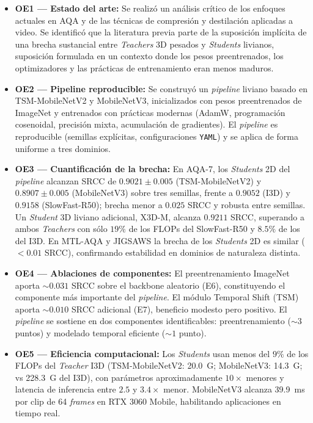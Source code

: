 \begin{itemize}
    \item \textbf{OE1 — Estado del arte:} Se realizó un análisis crítico de los enfoques actuales en \ac{AQA} y de las técnicas de compresión y destilación aplicadas a video. Se identificó que la literatura previa parte de la suposición implícita de una brecha sustancial entre \textit{Teachers} 3D pesados y \textit{Students} livianos, suposición formulada en un contexto donde los pesos preentrenados, los optimizadores y las prácticas de entrenamiento eran menos maduros.

    \item \textbf{OE2 — Pipeline reproducible:} Se construyó un \textit{pipeline} liviano basado en TSM-MobileNetV2 y MobileNetV3, inicializados con pesos preentrenados de ImageNet y entrenados con prácticas modernas (AdamW, programación cosenoidal, precisión mixta, acumulación de gradientes). El \textit{pipeline} es reproducible (semillas explícitas, configuraciones \texttt{YAML}) y se aplica de forma uniforme a tres dominios.

    \item \textbf{OE3 — Cuantificación de la brecha:} En AQA-7, los \textit{Students} 2D del \textit{pipeline} alcanzan \ac{SRCC} de $0.9021 \pm 0.005$ (TSM-MobileNetV2) y $0.8907 \pm 0.005$ (MobileNetV3) sobre tres semillas, frente a $0.9052$ (\ac{I3D}) y $0.9158$ (SlowFast-R50); brecha menor a $0.025$ \ac{SRCC} y robusta entre semillas. Un \textit{Student} 3D liviano adicional, X3D-M, alcanza $0.9211$ \ac{SRCC}, superando a ambos \textit{Teachers} con sólo $19\%$ de los \ac{FLOPs} del SlowFast-R50 y $8.5\%$ de los del \ac{I3D}. En MTL-AQA y JIGSAWS la brecha de los \textit{Students} 2D es similar ($<0.01$ \ac{SRCC}), confirmando estabilidad en dominios de naturaleza distinta.

    \item \textbf{OE4 — Ablaciones de componentes:} El preentrenamiento ImageNet aporta $\sim 0.031$ \ac{SRCC} sobre el backbone aleatorio (E6), constituyendo el componente más importante del \textit{pipeline}. El módulo Temporal Shift (\ac{TSM}) aporta $\sim 0.010$ \ac{SRCC} adicional (E7), beneficio modesto pero positivo. El \textit{pipeline} se sostiene en dos componentes identificables: preentrenamiento ($\sim 3$ puntos) y modelado temporal eficiente ($\sim 1$ punto).

    \item \textbf{OE5 — Eficiencia computacional:} Los \textit{Students} usan menos del $9\%$ de los \ac{FLOPs} del \textit{Teacher} \ac{I3D} (TSM-MobileNetV2: 20.0~G; MobileNetV3: 14.3~G; vs 228.3~G del \ac{I3D}), con parámetros aproximadamente $10\times$ menores y latencia de inferencia entre $2.5$ y $3.4\times$ menor. MobileNetV3 alcanza 39.9~ms por clip de 64 \textit{frames} en RTX 3060 Mobile, habilitando aplicaciones en tiempo real.


\end{itemize}
